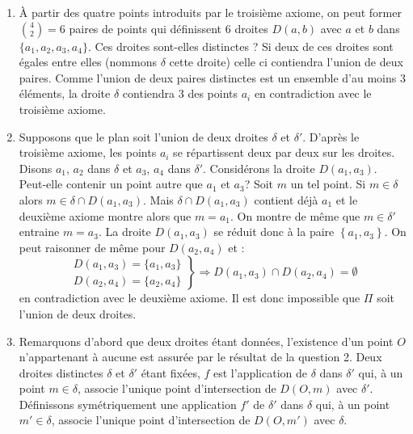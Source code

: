 \begin{enumerate}
 \item \`A partir des quatre points introduits par le troisième axiome, on peut former $\binom{4}{2}=6$ paires de points qui définissent $6$ droites $D(a,b)$ avec $a$ et $b$ dans $\{a_1,a_2,a_3,a_4\}$. Ces droites sont-elles distinctes ?\newline
Si deux de ces droites sont égales entre elles (nommons $\delta$ cette droite) celle ci contiendra l'union de deux paires. Comme l'union de deux paires distinctes est un ensemble d'au moins $3$ éléments, la droite $\delta$ contiendra $3$ des points $a_i$ en contradiction avec le troisième axiome. 
 \item Supposons que le plan soit l'union de deux droites $\delta$ et $\delta'$. D'après le troisième axiome, les points $a_i$ se répartissent deux par deux sur les droites. Disons $a_1$, $a_2$ dans $\delta$ et $a_3$, $a_4$ dans $\delta'$.\newline
Considérons la droite $D(a_1,a_3)$. Peut-elle contenir un point autre que $a_1$ et $a_3$?\newline
Soit $m$ un tel point. Si $m\in \delta$ alors $m\in \delta \cap D(a_1,a_3)$. Mais $\delta \cap D(a_1,a_3)$ contient déjà $a_1$ et le deuxième axiome montre alors que $m=a_1$. On montre de même que $m\in\delta'$ entraine $m=a_3$. La droite $D(a_1,a_3)$ se réduit donc à la paire $\left\lbrace a_1, a_3\right\rbrace$.  On peut raisonner de même pour $D(a_2,a_4)$ et :
\begin{displaymath}
 \left. 
\begin{aligned}
 D(a_1,a_3)=\{a_1,a_3\}\\D(a_2,a_4)=\{a_2,a_4\}
\end{aligned}
\right\rbrace \Rightarrow 
 D(a_1,a_3)\cap D(a_2,a_4)= \emptyset
\end{displaymath}
 en contradiction avec le deuxième axiome. Il est donc impossible que $\Pi$ soit l'union de deux droites.
 \item Remarquons d'abord que deux droites étant données, l'existence d'un point $O$ n'appartenant à aucune est assurée par le résultat de la question 2.\newline
Deux droites distinctes $\delta$ et $\delta'$ étant fixées, $f$ est l'application de $\delta$ dans $\delta'$ qui, à un point $m\in\delta$, associe l'unique point d'intersection de $D(O,m)$ avec $\delta'$.\newline
Définissons symétriquement une application $f'$ de $\delta'$ dans $\delta$ qui, à un point $m'\in\delta$, associe l'unique point d'intersection de $D(O,m')$ avec $\delta$.\newline

\end{enumerate}
